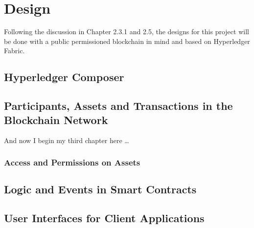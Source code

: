 \chapter{Design}

Following the discussion in Chapter 2.3.1 and 2.5, the designs for this project 
will be done with a public permissioned blockchain in mind and based on 
Hyperledger Fabric.

\section{Hyperledger Composer}

\section{Participants, Assets and Transactions in the Blockchain Network}
And now I begin my third chapter here \dots

\subsection{Access and Permissions on Assets}

\section{Logic and Events in Smart Contracts}

\section{User Interfaces for Client Applications}